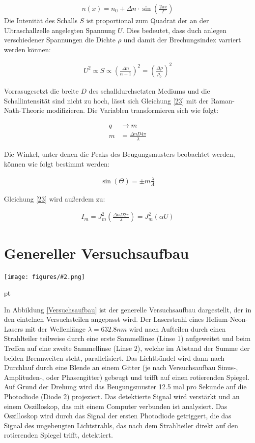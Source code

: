 \documentclass[12pt]{article}
\newcommand{\gra}[3][0.7]{
	\begin{minipage}[h!]{\textwidth}
		\centering
		\texttt{[image: figures/\#2.png]}
		\captionof{figure}{#3}
	\end{minipage}
	\vskip 30 pt
}
\begin{document}
\begin{align}
n\left(x \right) = n_0 + \Delta n \cdot \sin \left(\frac{2 \pi x}{\Gamma} \right) 
\end{align}
Die Intenität des Schalls $S$ ist proportional zum Quadrat der an der Ultraschallzelle angelegten Spannung $ U$. Dies bedeutet, dass duch anlegen verschiedener Spannungen die Dichte $\rho$ und damit der Brechungsindex varriert werden können:

\begin{align}
U^2 \propto S \propto \left( \frac{\Delta n}{n -1} \right)^2 = \left( \frac{\Delta \rho}{\rho_0}\right)^2  
\end{align}

Vorrasugesetzt die breite $D$ des schalldurchsetzten Mediums und die Schallintensität sind nicht zu hoch, lässt sich Gleichung \ref{23} mit der Raman-Nath-Theorie modifizieren. Die Variablen transformieren sich wie folgt:

\begin{align}
q &\rightarrow m\\
m &= \frac{\Delta n D 4 \pi}{\lambda}
\end{align}

Die Winkel, unter denen die Peaks des Beugungsmusters beobachtet werden, können wie folgt bestimmt werden:

\begin{align}
\sin\left( \Theta\right) = \pm m \frac{\lambda}{\Lambda}
\end{align}

Gleichung \ref{23} wird außerdem zu:

\begin{align}
I_m = J_m^2 \left( \frac{\Delta n D 2 \pi}{\lambda} \right) = J_m^2\left(\alpha U \right) 
\end{align}
\newpage
\section{Genereller Versuchsaufbau}

\gra[1]{Versuchsaufbau}{Versuchsaufbau \label{Versuchsaufbau}}

In Abbildung \ref{Versuchsaufbau} ist der generelle Versuchsaufbau dargestellt, der in den eintelnen Versuchsteilen angepasst wird.
Der Laserstrahl eines Helium-Neon-Lasers mit der Wellenlänge $\lambda = 632.8 nm$ wird nach Aufteilen durch einen Strahlteiler  teilweise durch eine erste Sammellinse (Linse 1) aufgeweitet und beim Treffen auf eine zweite Sammellinse (Linse 2), welche im Abstand der Summe der beiden Brennweiten steht, parallelisiert. Das Lichtbündel wird dann nach Durchlauf durch eine Blende an einem Gitter (je nach Versuchsaufbau Sinus-, Amplituden-, oder Phasengitter) gebeugt und trifft auf einen rotierenden Spiegel. Auf Grund der Drehung wird das Beugungsmuster 12.5 mal pro Sekunde auf die Photodiode (Diode 2) projeziert. Das detektierte Signal wird verstärkt und an einem Oszilloskop, das mit einem Computer verbunden ist analysiert. Das Oszilloskop wird durch das Signal der ersten Photodiode getriggert, die das Signal des ungebeugten Lichtstrahls, das nach dem Strahlteiler direkt auf den rotierenden Spiegel trifft, detektiert.
\end{document}
